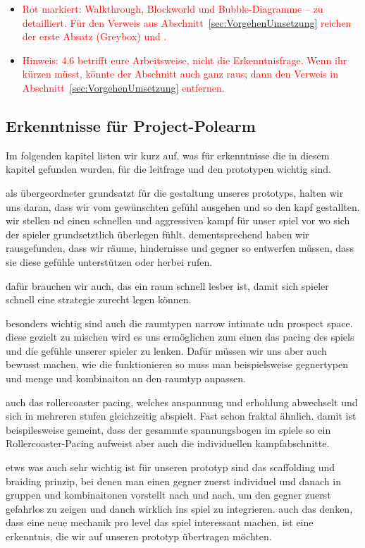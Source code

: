\documentclass[../Main.tex]{subfiles}
\begin{document}
\begin{itemize}[leftmargin=1.5cm]
    \item \textcolor{red}{Rot markiert: Walkthrough, Blockworld und Bubble-Diagramme -- zu detailliert. Für den Verweis aus Abschnitt~\ref{sec:VorgehenUmsetzung} reichen der erste Absatz (Greybox) und .}
    \item \textcolor{red}{Hinweis: 4.6 betrifft eure Arbeitsweise, nicht die Erkenntnisfrage. Wenn ihr kürzen müsst, könnte der Abschnitt auch ganz raus; dann den Verweis in Abschnitt~\ref{sec:VorgehenUmsetzung} entfernen.}
\end{itemize}

\subsection{Erkenntnisse für Project-Polearm} \label{sec:ZwischenfazitLD}

Im folgenden kapitel listen wir kurz auf, was für erkenntnisse die in diesem kapitel gefunden wurden, für die leitfrage und den prototypen wichtig sind.

als übergeordneter grundsatzt für die gestaltung unseres prototyps, halten wir uns daran, dass wir vom gewünschten gefühl ausgehen und so den kapf gestallten. wir stellen nd einen schnellen und aggressiven kampf für unser spiel vor wo sich der spieler grundsetztlich überlegen fühlt. dementsprechend haben wir rausgefunden, dass wir räume, hindernisse und gegner so entwerfen müssen, dass sie diese gefühle unterstützen oder herbei rufen.

dafür brauchen wir auch, das ein raum schnell lesber ist, damit sich spieler schnell eine strategie zurecht legen können.

besonders wichtig sind auch die raumtypen narrow intimate udn prospect space. diese gezielt zu mischen wird es uns ermöglichen zum einen das pacing des spiels und die gefühle unserer spieler zu lenken. Dafür müssen wir uns aber auch bewusst machen, wie die funktionieren so muss man beispielsweise gegnertypen und menge und kombinaiton an den raumtyp anpassen.

auch das rollercoaster pacing, welches anspannung und erhohlung abwechselt und sich in mehreren stufen gleichzeitig abspielt. Fast schon fraktal ähnlich. damit ist beispilesweise gemeint, dass der gesammte spannungsbogen im spiele so ein Rollercoaster-Pacing aufweist aber auch die individuellen kampfabschnitte.

etws was auch sehr wichtig ist für unseren prototyp sind das scaffolding und braiding prinzip, bei denen man einen gegner zuerst individuel und danach in gruppen und kombinaitonen vorstellt nach und nach. um den gegner zuerst gefahrlos zu zeigen und danch wirklich ins spiel zu integrieren. auch das denken, dass eine neue mechanik pro level das spiel interessant machen, ist eine erkenntnis, die wir auf unseren prototyp übertragen möchten.
\end{document}

